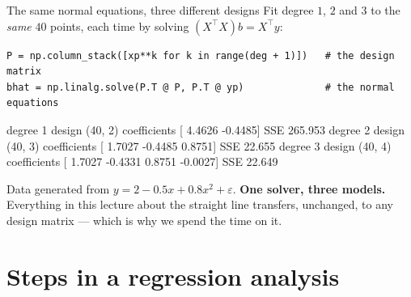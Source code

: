 \documentclass[aspectratio=169]{beamer}
\begin{document}
\begin{frame}[fragile,shrink=7]{The same normal equations, three different designs}
Fit degree $1$, $2$ and $3$ to the \emph{same} $40$ points, each time by
solving $(X^{\!\top}\!X)b = X^{\!\top}y$:
\begin{lstlisting}
P = np.column_stack([xp**k for k in range(deg + 1)])   # the design matrix
bhat = np.linalg.solve(P.T @ P, P.T @ yp)              # the normal equations
\end{lstlisting}
\begin{outblk}
degree 1  design (40, 2)  coefficients [ 4.4626 -0.4485]                  SSE 265.953
degree 2  design (40, 3)  coefficients [ 1.7027 -0.4485  0.8751]          SSE  22.655
degree 3  design (40, 4)  coefficients [ 1.7027 -0.4331  0.8751 -0.0027]  SSE  22.649
\end{outblk}
\begin{center}\small
  Data generated from $y = 2 - 0.5x + 0.8x^2 + \varepsilon$. \textbf{One
  solver, three models.} Everything in this lecture about the straight line
  transfers, unchanged, to any design matrix --- which is why we spend the
  time on it.
\end{center}
\end{frame}

\section[Steps]{Steps in a regression analysis}
\label{sec:steps}
\end{document}
